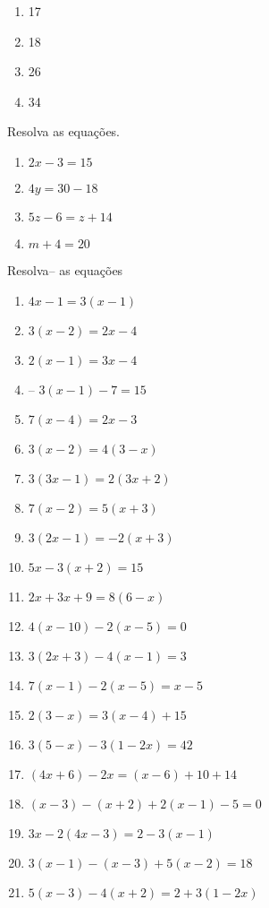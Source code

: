 					\begin{multicols}{4}					
					\begin{enumerate}
						\item 17
						\item 18
						\item 26   
						\item 34
					\end{enumerate}
					\end{multicols}
				\item Resolva as equações.
					\setlength{\columnseprule}{0pt}
					\setlength{\columnsep}{20pt}					
					\begin{multicols}{4}
					\begin{enumerate}
						\item $2x - 3 = 15                                                   $
						\item $4y = 30 - 18                                                 $
						\item $5z - 6 = z + 14                                              $
						\item $m + 4 = 20 $
					\end{enumerate}
					\end{multicols}
				\item Resolva– as equações
					\begin{multicols}{2}
					\begin{enumerate}
						\item $4x-1=3(x-1)$
						\item $3(x-2)=2x-4$
						\item $2(x-1)=3x-4$
						\item– $3(x-1)-7=15$
						\item $7(x-4)=2x-3$
						\item $3(x-2)=4(3-x)$
						\item $3(3x-1)=2(3x+2)$
						\item $7(x-2)=5(x+3)$
						\item $3(2x-1)=-2(x+3)$
						\item $5x-3(x+2)=15$
						\item $2x+3x+9=8(6-x)$
						\item $4(x-10)-2(x-5)=0$
						\item $3(2x+3)-4(x-1)=3$
						\item $7(x-1)-2(x-5)=x-5$
						\item $2(3-x)=3(x-4)+15$
						\item $3(5-x)-3(1-2x)=42$
						\item $(4x+6)-2x=(x-6)+10+14$
						\item $(x-3)-(x+2)+2(x-1)-5=0$
						\item $3x-2(4x-3)=2-3(x-1)$
						\item $3(x-1)-(x-3)+5(x-2)=18$
						\item $5(x-3)-4(x+2)=2+3(1-2x)$
					\end{enumerate}
					\end{multicols}
